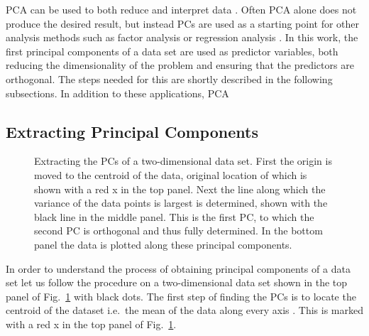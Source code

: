 \documentclass[english, twoside]{HYgradu}
\begin{document}
PCA can be used to both reduce and interpret data \citep{johnson2007applied}. Often PCA alone does not produce the desired result, but instead PCs are used as a starting point for other analysis methods such as factor analysis or regression analysis \citep{johnson2007applied}. In this work, the first principal components of a data set are used as predictor variables, both reducing the dimensionality of the problem and ensuring that the predictors are orthogonal. The steps needed for this are shortly described in the following subsections. In addition to  these applications, PCA 

\subsection{Extracting Principal Components}
\begin{figure}
    \centering
    
    \caption{Extracting the PCs of a two-dimensional data set. First the origin is moved to the centroid of the data, original location of which is shown with a red x in the top panel. Next the line along which the variance of the data points is largest is determined, shown with the black line in the middle panel. This is the first PC, to which the second PC is orthogonal and thus fully determined. In the bottom panel the data is plotted along these principal components.
    }\label{fig:pca-illustrated}
\end{figure}

In order to understand the process of obtaining principal components of a data set let us follow the procedure on a two-dimensional data set shown in the top panel of Fig.\ \ref{fig:pca-illustrated} with black dots. The first step of finding the PCs is to locate the centroid of the dataset i.e.\ the mean of the data along every axis \citep{smith2002tutorial}. This is marked with a red x in the top panel of Fig.\ \ref{fig:pca-illustrated}.
\end{document}
